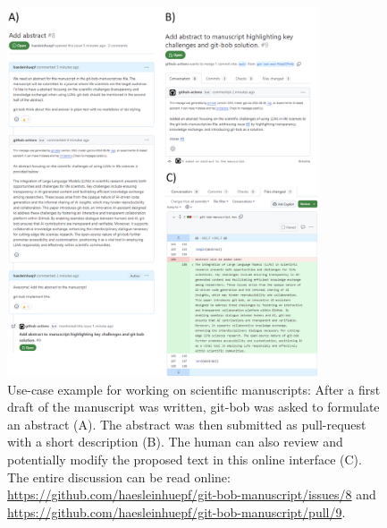 \documentclass{ecai}
\begin{document}
\begin{figure}[h]
\centering
\includegraphics[width=0.82\textwidth]{example_abstract_generation.png}
\caption{Use-case example for working on scientific manuscripts: After a first draft of the manuscript was written, git-bob was asked to formulate an abstract (A). The abstract was then submitted as pull-request with a short description (B). The human can also review and potentially modify the proposed text in this online interface (C). The entire discussion can be read online: \url{https://github.com/haesleinhuepf/git-bob-manuscript/issues/8} and \url{https://github.com/haesleinhuepf/git-bob-manuscript/pull/9}.
\newline
\newline
}
\label{fig:xample_abstract_generation}
\end{figure}
\end{document}
